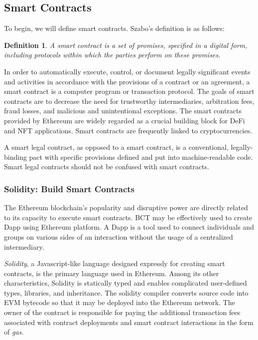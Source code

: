 \subsection{Smart Contracts}

To begin, we will define smart contracts. Szabo's \cite{def1} definition is as follows:


\newtheorem{definition}{Definition}
\begin{definition}
  A smart contract is a set of promises, specified in a digital form, including protocols within which the parties perform on these promises.
\end{definition}


In order to automatically execute, control, or document legally significant events and activities in accordance with the provisions of a contract or an agreement, a smart contract is a computer program or transaction protocol. The goals of smart contracts are to decrease the need for trustworthy intermediaries, arbitration fees, fraud losses, and malicious and unintentional exceptions. The smart contracts provided by Ethereum are widely regarded as a crucial building block for \ac{DeFi} and \ac{NFT} applications. Smart contracts are frequently linked to cryptocurrencies.

\vspace{.5cm}

A smart legal contract, as opposed to a smart contract, is a conventional, legally-binding pact with specific provisions defined and put into machine-readable code. Smart legal contracts should not be confused with smart contracts.

\subsubsection{Solidity: Build Smart Contracts}

The Ethereum blockchain's popularity and disruptive power are directly related to its capacity to execute smart contracts. \ac{BCT} may be effectively used to create \ac{Dapp} using Ethereum platform. A \ac{Dapp} is a tool used to connect individuals and groups on various sides of an interaction without the usage of a centralized intermediary.

\vspace{.5cm}

\textit{Solidity}, a Javascript-like language designed expressly for creating smart contracts, is the primary language used in Ethereum. Among its other characteristics, Solidity is statically typed and enables complicated user-defined types, libraries, and inheritance. The solidity compiler converts source code into \ac{EVM} bytecode so that it may be deployed into the Ethereum network. The owner of the contract is responsible for paying the additional transaction fees associated with contract deployments and smart contract interactions in the form of \textit{gas}.


